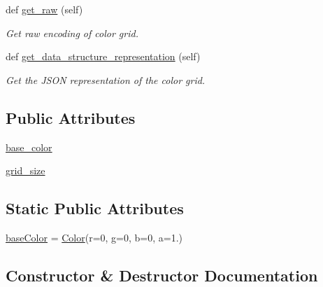 \begin{DoxyCompactItemize}
def \hyperlink{classbridges_1_1color__grid_1_1_color_grid_ab6685633fe237eb118cf2db2f624cd60}{get\+\_\+raw} (self)
\begin{DoxyCompactList}\small\item\em Get raw encoding of color grid. \end{DoxyCompactList}\item 
def \hyperlink{classbridges_1_1color__grid_1_1_color_grid_afda80f44711e0c32c96161d1e681d788}{get\+\_\+data\+\_\+structure\+\_\+representation} (self)
\begin{DoxyCompactList}\small\item\em Get the J\+S\+ON representation of the color grid. \end{DoxyCompactList}\end{DoxyCompactItemize}
\subsection*{Public Attributes}
\begin{DoxyCompactItemize}
\item 
\hyperlink{classbridges_1_1color__grid_1_1_color_grid_af7c28369f01fb4dfc82a5824583a6dbf}{base\+\_\+color}
\item 
\hyperlink{classbridges_1_1color__grid_1_1_color_grid_af248634de8b3d7b92feef01eed40821b}{grid\+\_\+size}
\end{DoxyCompactItemize}
\subsection*{Static Public Attributes}
\begin{DoxyCompactItemize}
\item 
\hyperlink{classbridges_1_1color__grid_1_1_color_grid_ad2db62703be80114e46b490ff02f8bd9}{base\+Color} = \hyperlink{classbridges_1_1color_1_1_color}{Color}(r=0, g=0, b=0, a=1.)
\end{DoxyCompactItemize}


\subsection{Constructor \& Destructor Documentation}
\mbox{\label{classbridges_1_1color__grid_1_1_color_grid_aa4b484e518b5fc0c970ea36e8500dbe5}} 
